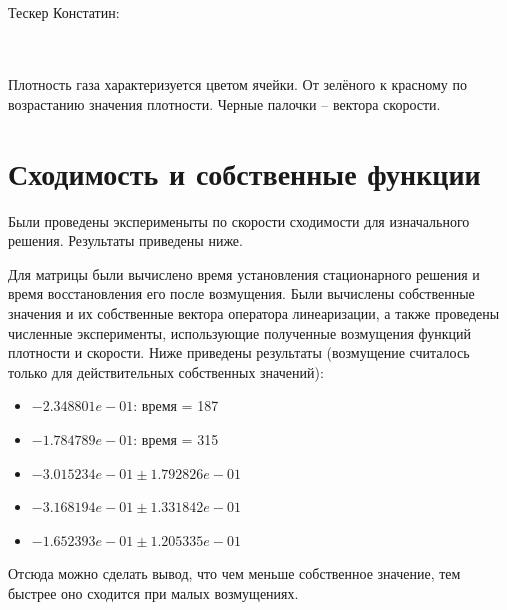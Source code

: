 \documentclass[a4paper, 25pt]{article}
\begin{document}
\\
Тескер Констатин:
\begin{figure}[h!]
\end{figure}
\\
\\
Плотность газа характеризуется цветом ячейки. От зелёного к красному по возрастанию значения плотности. Черные палочки -- вектора скорости.

\newpage
\section{Сходимость и собственные функции}
Были проведены эксперименыты по скорости сходимости для изначального решения. Результаты приведены ниже.

Для матрицы были вычислено время установления стационарного решения и время восстановления его после возмущения. Были вычислены собственные значения
и их собственные вектора оператора линеаризации, а также проведены численные эксперименты, использующие полученные возмущения функций плотности и 
скорости. Ниже приведены результаты (возмущение считалось только для действительных собственных значений):
\begin{itemize}
 \item $-2.348801e-01$: время = 187
 \item $-1.784789e-01$: время = 315
 \item $-3.015234e-01 \pm 1.792826e-01$
 \item $-3.168194e-01 \pm 1.331842e-01$
 \item $-1.652393e-01 \pm 1.205335e-01$
\end{itemize}
Отсюда можно сделать вывод, что чем меньше собственное значение, тем быстрее оно сходится при малых возмущениях.
\end{document}
